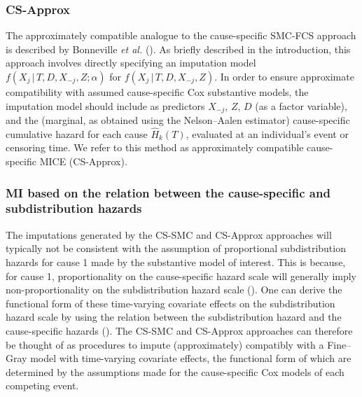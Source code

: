 \documentclass[
  letterpaper,
  DIV=11,
  numbers=noendperiod]{scrreprt}
\newcommand{\given}{\,|\,}
\begin{document}
\subsubsection{CS-Approx}\label{sec-cs-approx}

The approximately compatible analogue to the cause-specific SMC-FCS
approach is described by Bonneville \emph{et al.}
(). As
briefly described in the introduction, this approach involves directly
specifying an imputation model \(f(X_j \given T, D, X_{-j}, Z;\alpha)\)
for \(f(X_j \given T, D, X_{-j}, Z)\). In order to ensure approximate
compatibility with assumed cause-specific Cox substantive models, the
imputation model should include as predictors \(X_{-j}\), \(Z\), \(D\)
(as a factor variable), and the (marginal, as obtained using the
Nelson--Aalen estimator) cause-specific cumulative hazard for each cause
\(\hat{H}_k(T)\), evaluated at an individual's event or censoring time.
We refer to this method as approximately compatible cause-specific MICE
(CS-Approx).

\subsubsection{MI based on the relation between the cause-specific and
subdistribution
hazards}\label{mi-based-on-the-relation-between-the-cause-specific-and-subdistribution-hazards}

The imputations generated by the CS-SMC and CS-Approx approaches will
typically not be consistent with the assumption of proportional
subdistribution hazards for cause 1 made by the substantive model of
interest. This is because, for cause 1, proportionality on the
cause-specific hazard scale will generally imply non-proportionality on
the subdistribution hazard scale
(). One can derive the functional form of these
time-varying covariate effects on the subdistribution hazard scale by
using the relation between the subdistribution hazard and the
cause-specific hazards
(). The CS-SMC and CS-Approx approaches can therefore be
thought of as procedures to impute (approximately) compatibly with a
Fine--Gray model with time-varying covariate effects, the functional
form of which are determined by the assumptions made for the
cause-specific Cox models of each competing event.
\end{document}
